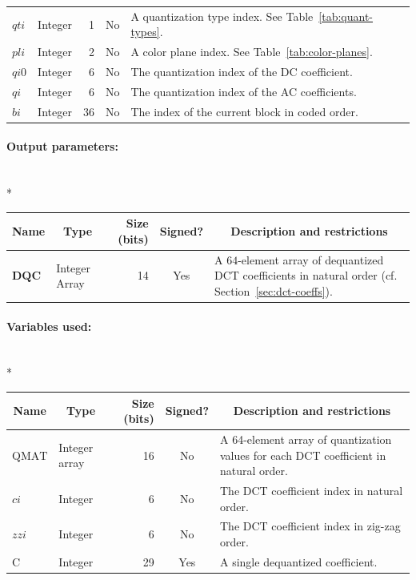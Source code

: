 \documentclass[9pt,letterpaper]{book}
\newcommand{\idx}[1]{{\ensuremath{\mathit{#1}}}}
\newcommand{\qti}{\idx{qti}}
\newcommand{\pli}{\idx{pli}}
\newcommand{\qi}{\idx{qi}}
\newcommand{\ci}{\idx{ci}}
\newcommand{\bi}{\idx{bi}}
\newcommand{\zzi}{\idx{zzi}}
\newcommand{\bitvar}[1]{\ensuremath{\mathbf{\bm{#1}}}}
\newcommand{\locvar}[1]{\ensuremath{\mathrm{#1}}}
\numberwithin{equation}{chapter}
\numberwithin{figure}{chapter}
\numberwithin{table}{chapter}
\begin{document}
\begin{tabularx}{\textwidth}{@{}llrcX@{}}
\bitvar{\qti}    & Integer &  1 & No  & A quantization type index.
See Table~\ref{tab:quant-types}.\\
\bitvar{\pli}    & Integer &  2 & No  & A color plane index.
See Table~\ref{tab:color-planes}.\\
\bitvar{\idx{qi0}} & Integer &  6 & No  & The quantization index of the DC
 coefficient. \\
\bitvar{\qi}     & Integer &  6 & No  & The quantization index of the AC
 coefficients. \\
\bitvar{\bi}     & Integer & 36 & No  & The index of the current block in
 coded order. \\
\bottomrule\end{tabularx}

\paragraph{Output parameters:}\hfill\\*
\begin{tabularx}{\textwidth}{@{}llrcX@{}}\toprule
\multicolumn{1}{c}{Name} &
\multicolumn{1}{c}{Type} &
\multicolumn{1}{p{30pt}}{\centering Size (bits)} &
\multicolumn{1}{c}{Signed?} &
\multicolumn{1}{c}{Description and restrictions} \\\midrule\endhead
\bitvar{DQC}   & \multicolumn{1}{p{40pt}}{Integer Array} &
                              14 & Yes & A $64$-element array of dequantized
 DCT coefficients in natural order (cf. Section~\ref{sec:dct-coeffs}). \\
\bottomrule\end{tabularx}

\paragraph{Variables used:}\hfill\\*
\begin{tabularx}{\textwidth}{@{}llrcX@{}}\toprule
\multicolumn{1}{c}{Name} &
\multicolumn{1}{c}{Type} &
\multicolumn{1}{p{30pt}}{\centering Size (bits)} &
\multicolumn{1}{c}{Signed?} &
\multicolumn{1}{c}{Description and restrictions} \\\midrule\endhead
\locvar{QMAT}    & \multicolumn{1}{p{40pt}}{Integer array} &
                             16 & No  & A 64-element array of quantization
 values for each DCT coefficient in natural order. \\
\locvar{\ci}     & Integer &  6 & No  & The DCT coefficient index in natural
 order. \\
\locvar{\zzi}    & Integer &  6 & No  & The DCT coefficient index in zig-zag
 order. \\
\locvar{C}       & Integer & 29 & Yes & A single dequantized coefficient. \\
\bottomrule\end{tabularx}
\medskip
\end{document}
